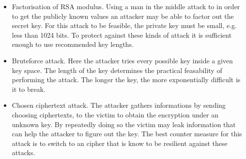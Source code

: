 \begin {itemize}

\item Factorisation of RSA modulus. Using a man in the middle attack to in order to get the publicly known values an attacker may be able to factor out the secret key. For this attack to be feasible, the private key must be small, e.g. less than 1024 bits. To protect against these kinds of attack it is sufficient enough to use recommended key lengths. \cite {nisc}  

\item Bruteforce attack. Here the attacker tries every possible key inside a given key space. The length of the key determines the practical feasability of performing the attack. The longer the key, the more exponentially difficult is it to break. 

\item Chosen ciphertext attack. The attacker gathers informations by sending choosing ciphertexts, to the victim to obtain the encryption under an unknown key. By repeatedly doing so the victim may leak information that can help the attacker to figure out the key. The best counter measure for this attack is to switch to an cipher that is know to be resilient against these attacks. 
\end {itemize}






